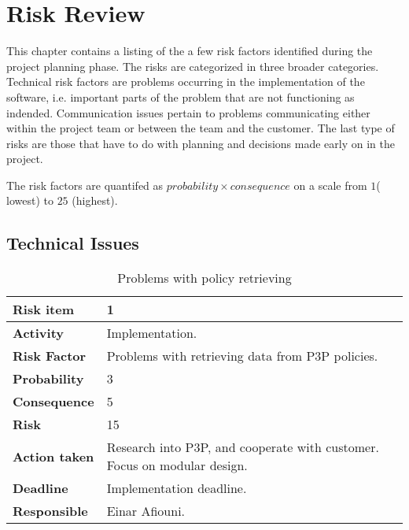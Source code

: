 \chapter{Risk Review}\label{riskAppendix}

\minitoc


This chapter contains a listing of the a few risk factors identified during the project planning phase. The risks are categorized in three broader categories. Technical risk factors are problems occurring in the implementation of the software, i.e. important parts of the problem that are not functioning as indended. Communication issues pertain to problems communicating either within the project team or between the team and the customer. The last type of risks are those that have to do with planning and decisions made early on in the project.

The risk factors are quantifed as $probability \times consequence$ on a scale from $1$( lowest) to $25$ (highest).


\section{Technical Issues}


\begin{table}[h!]

\begin{center}
\begin{tabularx}{\textwidth}{| X | X |}
\hline
\textbf{Risk item} & 1 \\
\hline
\textbf{Activity} & Implementation.  \\
\hline
\textbf{Risk Factor} & Problems with retrieving data from P3P policies. \\
\hline
\textbf{Probability} & 3 \\
\hline
\textbf{Consequence} & 5 \\
\hline
\textbf{Risk} & 15 \\
\hline
\textbf{Action taken} & Research into P3P, and cooperate with
customer. Focus on modular design. \\
\hline
\textbf{Deadline} & Implementation deadline. \\
\hline
\textbf{Responsible} & Einar Afiouni. \\
\hline
\end{tabularx}
\caption{Problems with policy retrieving}
\end{center}
\label{risk_3}
\end{table}

